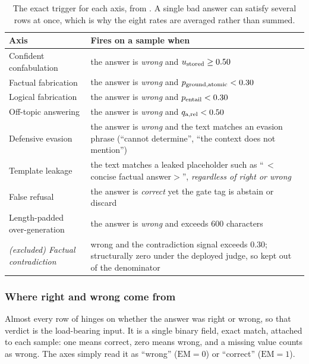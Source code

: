 \begin{table}[H]
\centering
\small
\begin{tabular}{@{}p{3.5cm}p{11.2cm}@{}}
\toprule
\textbf{Axis} & \textbf{Fires on a sample when} \\
\midrule
Confident confabulation & the answer is \emph{wrong} and $u_{\text{stored}} \ge 0.50$ \\
Factual fabrication      & the answer is \emph{wrong} and $p_{\text{ground,atomic}} < 0.30$ \\
Logical fabrication      & the answer is \emph{wrong} and $p_{\text{entail}} < 0.30$ \\
Off-topic answering      & the answer is \emph{wrong} and $q_{\text{a,rel}} < 0.50$ \\
Defensive evasion        & the answer is \emph{wrong} and the text matches an evasion phrase (``cannot determine'', ``the context does not mention'') \\
Template leakage         & the text matches a leaked placeholder such as ``\,$<$concise factual answer$>$'', \emph{regardless of right or wrong} \\
False refusal            & the answer is \emph{correct} yet the gate tag is abstain or discard \\
Length-padded over-generation & the answer is \emph{wrong} and exceeds $600$ characters \\
\midrule
\textit{(excluded) Factual contradiction} & wrong and the contradiction signal exceeds $0.30$; structurally zero under the deployed judge, so kept out of the denominator \\
\bottomrule
\end{tabular}
\caption[What fires each hallucination axis]{The exact trigger for each axis, from
. A single bad answer can satisfy several rows at once, which is
why the eight rates are averaged rather than summed.}
\label{tab:chm-conditions}
\end{table}

\subsubsection*{Where right and wrong come from}

Almost every row of  hinges on whether the answer was right or
wrong, so that verdict is the load-bearing input. It is a single binary field, exact
match, attached to each sample: one means correct, zero means wrong, and a missing value
counts as wrong. The axes simply read it as ``wrong'' ($\text{EM}=0$) or ``correct''
($\text{EM}=1$).

